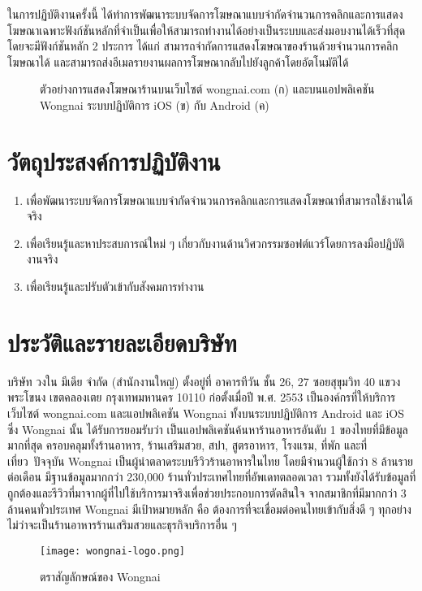 ในการปฏิบัติงานครั้งนี้ ได้ทำการพัฒนาระบบจัดการโฆษณาแบบจำกัดจำนวนการคลิกและการแสดงโฆษณาเฉพาะฟังก์ชันหลักที่จำเป็นเพื่อให้สามารถทำงานได้อย่างเป็นระบบและส่งมอบงานได้เร็วที่สุด โดยจะมีฟังก์ชันหลัก 2 ประการ ได้แก่ สามารถจำกัดการแสดงโฆษณาของร้านด้วยจำนวนการคลิกโฆษณาได้ และสามารถส่งอีเมลรายงานผลการโฆษณากลับไปยังลูกค้าโดยอัตโนมัติได้

\begin{figure}[!p]
	\centering
	\caption{ตัวอย่างการแสดงโฆษณาร้านบนเว็บไซต์ wongnai.com (ก) และบนแอปพลิเคชัน Wongnai ระบบปฏิบัติการ iOS (ข) กับ Android (ค)}
	\label{Fig:listingad}
\end{figure}

\section{วัตถุประสงค์การปฏิบัติงาน}
\begin{enumerate}
	\item เพื่อพัฒนาระบบจัดการโฆษณาแบบจำกัดจำนวนการคลิกและการแสดงโฆษณาที่สามารถใช้งานได้จริง
	\item เพื่อเรียนรู้และหาประสบการณ์ใหม่ ๆ เกี่ยวกับงานด้านวิศวกรรมซอฟต์แวร์โดยการลงมือปฏิบัติงานจริง
	\item เพื่อเรียนรู้และปรับตัวเข้ากับสังคมการทำงาน
\end{enumerate}

\section{ประวัติและรายละเอียดบริษัท}
บริษัท วงใน มีเดีย จำกัด (สำนักงานใหญ่) ตั้งอยู่ที่ อาคารทีวัน ชั้น 26, 27 ซอยสุขุมวิท 40 แขวงพระโขนง เขตคลองเตย กรุงเทพมหานคร 10110 ก่อตั้งเมื่อปี พ.ศ. 2553 เป็นองค์กรที่ให้บริการเว็บไซต์ wongnai.com และแอปพลิเคชัน Wongnai ทั้งบนระบบปฏิบัติการ Android และ iOS ซึ่ง Wongnai นั้น ได้รับการยอมรับว่า เป็นแอปพลิเคชันค้นหาร้านอาหารอันดับ 1 ของไทยที่มีข้อมูลมากที่สุด ครอบคลุมทั้งร้านอาหาร, ร้านเสริมสวย, สปา, สูตรอาหาร, โรงแรม, ที่พัก และที่เที่ยว ปัจจุบัน Wongnai เป็นผู้นำตลาดระบบรีวิวร้านอาหารในไทย โดยมีจำนวนผู้ใช้กว่า 8 ล้านรายต่อเดือน มีฐานข้อมูลมากกว่า 230,000 ร้านทั่วประเทศไทยที่อัพเดทตลอดเวลา รวมทั้งยังได้รับข้อมูลที่ถูกต้องและรีวิวที่มาจากผู้ที่ไปใช้บริการมาจริงเพื่อช่วยประกอบการตัดสินใจ จากสมาชิกที่มีมากกว่า 3 ล้านคนทั่วประเทศ Wongnai มีเป้าหมายหลัก คือ ต้องการที่จะเชื่อมต่อคนไทยเข้ากับสิ่งดี ๆ ทุกอย่างไม่ว่าจะเป็นร้านอาหารร้านเสริมสวยและธุรกิจบริการอื่น ๆ

\begin{figure}[!h]
	\centering
	\texttt{[image: wongnai-logo.png]}  
	\caption{ตราสัญลักษณ์ของ Wongnai}
	\label{Fig:wongnai-logo}
\end{figure}